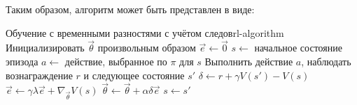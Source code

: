 Таким образом, алгоритм может быть представлен в виде:

\begin{alg}{Обучение с временными разностями с учётом следов}{rl-algorithm}
    \State Инициализировать $\vec{\theta}$ произвольным образом
        \State $\vec{e} \gets \vec{0}$
        \State $s \gets$ начальное состояние эпизода
            \State $a \gets$ действие, выбранное по $\pi$ для $s$
            \State Выполнить действие $a$, наблюдать вознаграждение $r$ и следующее состояние $s'$
            \State $\delta \gets r + \gamma V(s') - V(s)$
            \State $\vec{e} \gets \gamma \lambda \vec{e} + \nabla_{\vec{\theta}} V(s)$
            \State $\vec{\theta} \gets \vec{\theta} + \alpha \delta \vec{e}$
            \State $s \gets s'$
        \EndWhile
    \EndWhile
\end{alg}
